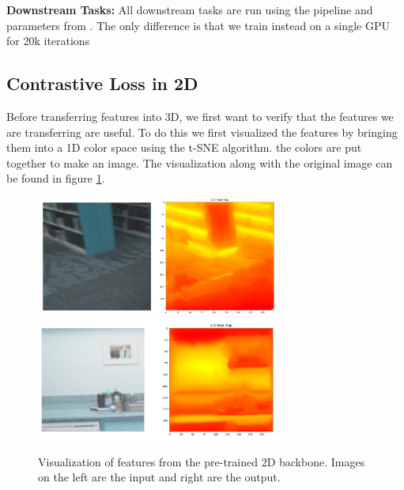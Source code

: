 \documentclass[10pt,twocolumn,letterpaper]{article}
\newcommand{\AJ}[1]{{\color{red}{[Andrej: #1]}}}
\begin{document}
\textbf{Downstream Tasks:} All downstream tasks are run using the pipeline and parameters from \cite{hou2021Exploring}. The only difference is that we train instead on a single GPU for 20k iterations

\subsection{Contrastive Loss in 2D}
\label{sec:results:2d}

Before transferring features into 3D, we first want to verify that the features we are transferring are useful. To do this we first visualized the features by bringing them into a 1D color space using the t-SNE \cite{maaten2008Visualizing} algorithm. the colors are put together to make an image. The visualization along with the original image can be found in figure \ref{fig:features2dvis}.

\AJ{Need to train a 2D segmentation with and without pre-training.}

\begin{figure}
    \centering
    \includegraphics[width=8cm]{images/experiments/25.02.2022-image-pretrain-vis2.png}
    \includegraphics[width=8cm]{images/experiments/25.02.2022-image-pretrain-vis1.png}
    \caption{Visualization of features from the pre-trained 2D backbone. Images on the left are the input and right are the output.}
    \label{fig:features2dvis}
\end{figure}
\end{document}
